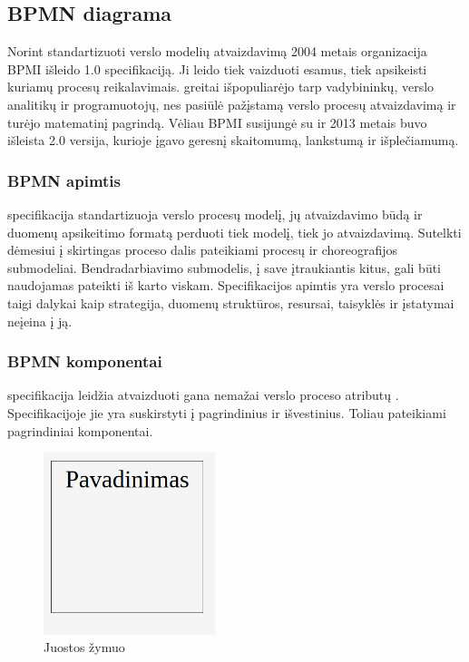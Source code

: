 \subsection{BPMN diagrama} \label{section:bpmn}
Norint standartizuoti verslo modelių atvaizdavimą 2004 metais organizacija BPMI išleido \BPMN{} 1.0 specifikaciją. Ji leido tiek vaizduoti esamus, tiek apsikeisti kuriamų procesų reikalavimais. \BPMN{} greitai išpopuliarėjo tarp vadybininkų, verslo analitikų ir programuotojų, nes pasiūlė pažįstamą verslo procesų atvaizdavimą ir turėjo matematinį pagrindą. Vėliau BPMI susijungė su \OMG{} ir 2013 metais buvo išleista \BPMN{} 2.0 versija, kurioje \BPMN{} įgavo geresnį skaitomumą, lankstumą ir išplečiamumą.

\subsubsection{BPMN apimtis}
\BPMN{} specifikacija standartizuoja verslo procesų modelį, jų atvaizdavimo būdą ir duomenų apsikeitimo formatą perduoti tiek modelį, tiek jo atvaizdavimą. Sutelkti dėmesiui į skirtingas proceso dalis pateikiami procesų ir choreografijos submodeliai. Bendradarbiavimo submodelis, į save įtraukiantis kitus, gali būti naudojamas pateikti iš karto viskam. Specifikacijos apimtis yra verslo procesai taigi dalykai kaip strategija, duomenų struktūros, resursai, taisyklės ir įstatymai neįeina į ją.

\subsubsection{BPMN komponentai} \label{section:bpmn_components}
\BPMN{} specifikacija leidžia atvaizduoti gana nemažai verslo proceso atributų \cite{bpmnFormal}. Specifikacijoje jie yra suskirstyti į pagrindinius ir išvestinius. Toliau pateikiami pagrindiniai \BPMN{} komponentai.

\begin{figure}[H]
	\centering
	\includegraphics[width=5cm]{img/bpm-components/pool}
	\caption{Juostos žymuo}
	\label{img:bpm_components_pool}
\end{figure}


